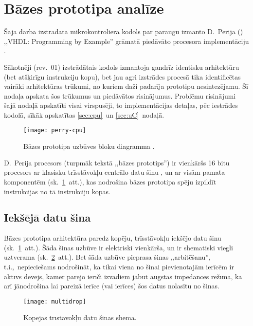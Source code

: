 \section{Bāzes prototipa analīze}
Šajā darbā izstrādātā mikrokontroliera kodols par paraugu izmanto
D.~Perija () ,,VHDL: Programming by Example'' grāmatā
piedāvāto procesora imple\-men\-tā\-ciju \cite{Perry-VHDL}.

Sākotnēji (rev.~01) izstrādātais kodols izmantoja gandrīz identisku
arhitektūru (bet atšķirīgu instrukciju kopu), bet
jau agri izstrādes procesā tika identificētas vairāki arhitektūras trūkumi,
no kuriem daži padarīja prototipu nesintezējamu.
Šī nodaļa apskata šos trūkumus un piedāvātos risinājumus.
Problēmu risinājumi šajā nodaļā apskatīti visai virspusēji,
to implementācijas detaļas, pēc iestrādes kodolā,
sīkāk apskatītas \ref{sec:cpu}~un \ref{sec:uC}~nodaļā.

\begin{figure}[thb]
	\centering
	\texttt{[image: perry-cpu]}
	\caption[Bāzes prototipa uzbūves bloku diagramma.]
	        {Bāzes prototipa uzbūves bloku diagramma \cite[290.~lpp.]{Perry-VHDL}.}
	\label{fig:perry-cpu}
\end{figure}

D.~Perija procesors (turpmāk tekstā ,,bāzes prototips'')
ir vienkāršs 16 bitu procesors ar klasisku trīsstāvokļu 
centrālo datu šinu \cite{Flynn-arch}\cite{Heath}, un ar visām pamata
komponentēm (sk.~\ref{fig:perry-cpu}~att.), kas nodrošina bāzes prototipa
spēju izpildīt instrukcijas no tā instrukciju kopas.

\subsection{Iekšējā datu šina} \label{sec:perry-bus}
	Bāzes prototipa arhitektūra paredz kopēju, trīsstāvokļu iekšējo datu šinu
	(sk.~\ref{fig:perry-cpu}~att.).
	Šāda šinas uzbūve ir elektriski vienkārša, un ir shematiski viegli uztverama
	(sk.~\ref{fig:multidrop}~att.). Bet šāda uzbūve pieprasa šinas 
	,,arbitēšanu'', t.i.,~nepieciešams
	nodrošināt, ka tikai viena no šinai pievienotajām ierīcēm ir aktīvs devējs,
	kamēr pārējo ierīči izvadiem jābūt augstas impedances režīmā, kā arī
	jānodrošina lai pareizā ierīce (vai ierīces) šos datus nolasītu no šinas.

	\begin{figure}[thb]
		\centering
		\texttt{[image: multidrop]}
		\caption{Kopējas trīstāvokļu datu šinas shēma.}
		\label{fig:multidrop}
	\end{figure}

